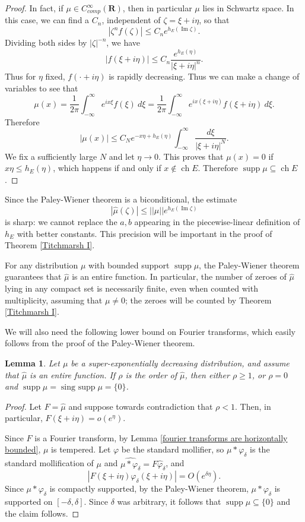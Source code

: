 \documentclass[12pt]{report}
\newcommand{\RR}{\mathbf{R}}
\DeclareMathOperator{\ch}{ch}
\DeclareMathOperator{\singsupp}{sing~supp}
\DeclareMathOperator{\supp}{supp}
\renewcommand{\Im}{\operatorname{Im}}
\newtheorem{lemma}[theorem]{Lemma}
\theoremstyle{definition}
\begin{document}
\begin{proof}
    In fact, if $\mu \in C^\infty_{comp}(\RR)$, then in particular $\mu$ lies in Schwartz space. In this case, we can find a $C_n$, independent of $\zeta = \xi + i\eta$, so that
$$|\zeta^n f(\zeta)| \leq C_n e^{h_E(\Im \zeta)}.$$
    Dividing both sides by $|\zeta|^{-n}$, we have
    $$|f(\xi + i \eta)| \leq C_n \frac{e^{h_E(\eta)}}{|\xi + i\eta|^n}.$$
    Thus for $\eta$ fixed, $f(\cdot + i\eta)$ is rapidly decreasing. Thus we can make a change of variables to see that
$$\mu(x) = \frac{1}{2\pi} \int_{-\infty}^\infty e^{ix\xi} f(\xi) ~d\xi = \frac{1}{2\pi} \int_{-\infty}^\infty e^{ix(\xi+i\eta)} f(\xi + i\eta) ~d\xi.$$
    Therefore
    $$|\mu(x)| \leq C_Ne^{-x\eta + h_E(\eta)} \int_{-\infty}^\infty \frac{d\xi}{|\xi + i\eta|^N}.$$
    We fix a sufficiently large $N$ and let $\eta \to 0$. This proves that $\mu(x) = 0$ if $x\eta \leq h_E(\eta)$, which happens if and only if $x \notin \ch E$. Therefore $\supp \mu \subseteq \ch E$.
\end{proof}
    Since the Paley-Wiener theorem is a biconditional, the estimate
    $$|\hat \mu(\zeta)| \leq ||\mu|| e^{h_E(\Im \zeta)}$$
    is sharp: we cannot replace the $a, b$ appearing in the piecewise-linear definition of $h_E$ with better constants. This precision will be important in the proof of Theorem \ref{Titchmarsh I}.

    For any distribution $\mu$ with bounded support $\supp \mu$, the Paley-Wiener theorem guarantees that $\hat \mu$ is an entire function. In particular, the number of zeroes of $\hat \mu$ lying in any compact set is necessarily finite, even when counted with multiplicity, assuming that $\mu \neq 0$; the zeroes will be counted by Theorem \ref{Titchmarsh I}.

    We will also need the following lower bound on Fourier transforms, which easily follows from the proof of the Paley-Wiener theorem.
\begin{lemma}
\label{fourier transforms are at least exponential type}
Let $\mu$ be a super-exponentially decreasing distribution, and assume that $\hat \mu$ is an entire function. If $\rho$ is the order of $\hat \mu$, then either $\rho \geq 1$, or $\rho = 0$ and $\supp \mu = \singsupp \mu = \{0\}$.
\end{lemma}
\begin{proof}
Let $F = \hat \mu$ and suppose towards contradiction that $\rho < 1$. Then, in particular, $F(\xi + i\eta) = o(e^{\eta})$.

Since $F$ is a Fourier transform, by Lemma \ref{fourier transforms are horizontally bounded}, $\mu$ is tempered.
Let $\varphi$ be the standard mollifier, so $\mu * \varphi_\delta$ is the standard mollification of $\mu$ and $\widehat{\mu * \varphi_\delta} =  F\hat \varphi_\delta$, and
$$|F(\xi + i\eta)\varphi_\delta(\xi + i\eta)| = O(e^{\delta\eta}).$$
Since $\mu * \varphi_\delta$ is compactly supported, by the Paley-Wiener theorem, $\mu*\varphi_\delta$ is supported on $[-\delta, \delta]$.
Since $\delta$ was arbitrary, it follows that $\supp \mu \subseteq \{0\}$ and the claim follows.
\end{proof}
\end{document}
